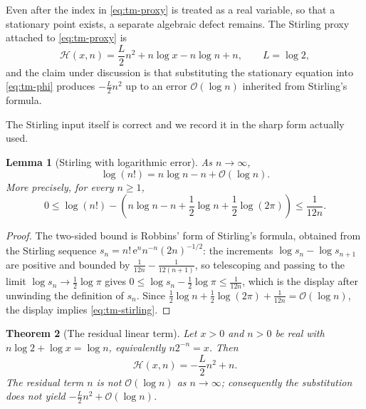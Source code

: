 \documentclass[11pt,oneside]{article}
\newtheorem{theorem}{Theorem}[section]
\newtheorem{lemma}[theorem]{Lemma}
\theoremstyle{definition}
\theoremstyle{remark}
\newcommand{\e}{\mathrm e}
\newcommand{\bigO}{\mathcal O}
\begin{document}
Even after the index in \eqref{eq:tm-proxy} is treated as a real variable, so that a
stationary point exists, a separate algebraic defect remains.  The Stirling proxy attached
to \eqref{eq:tm-proxy} is
\begin{equation}
 \mathcal H(x,n)=\frac L2n^2+n\log x-n\log n+n,
 \qquad L=\log2,                                           \label{eq:tm-phi}
\end{equation}
and the claim under discussion is that substituting the stationary equation into
\eqref{eq:tm-phi} produces $-\tfrac L2n^2$ up to an error $\bigO(\log n)$ inherited from
Stirling's formula.

The Stirling input itself is correct and we record it in the sharp form actually used.

\begin{lemma}[Stirling with logarithmic error]
\label{thm:tm-stirling}
As $n\to\infty$,
\begin{equation}
 \log(n!)=n\log n-n+\bigO(\log n).                         \label{eq:tm-stirling}
\end{equation}
More precisely, for every $n\ge1$,
\begin{equation*}
 0\le\log(n!)-\left(n\log n-n+\frac12\log n+\frac12\log(2\pi)\right)\le\frac1{12n}.
\end{equation*}
\end{lemma}

\begin{proof}
The two-sided bound is Robbins' form of Stirling's formula, obtained from the Stirling
sequence $s_n=n!\,\e^{n}n^{-n}(2n)^{-1/2}$: the increments $\log s_n-\log s_{n+1}$ are
positive and bounded by $\frac1{12n}-\frac1{12(n+1)}$, so telescoping and passing to the
limit $\log s_n\to\tfrac12\log\pi$ gives
$0\le\log s_n-\tfrac12\log\pi\le\frac1{12n}$, which is the display after unwinding the
definition of $s_n$.  Since $\tfrac12\log n+\tfrac12\log(2\pi)+\frac1{12n}=\bigO(\log n)$,
the display implies \eqref{eq:tm-stirling}.
\end{proof}

\begin{theorem}[The residual linear term]
\label{thm:tm-linear-residue}
Let $x>0$ and $n>0$ be real with $n\log2+\log x=\log n$, equivalently $n2^{-n}=x$.  Then
\begin{equation}
 \mathcal H(x,n)=-\frac L2n^2+n .                          \label{eq:tm-phi-stationary}
\end{equation}
The residual term $n$ is not $\bigO(\log n)$ as $n\to\infty$; consequently the substitution
does not yield $-\tfrac L2n^2+\bigO(\log n)$.
\end{theorem}
\end{document}
